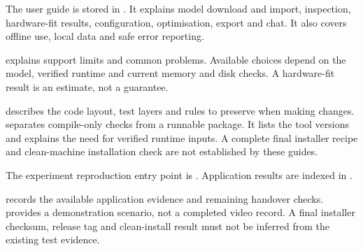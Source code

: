 

The user guide is stored in
. It explains model download
and import, inspection, hardware-fit results, configuration,
optimisation, export and chat. It also covers offline use,
local data and safe error reporting.

 explains support
limits and common problems. Available choices depend on the
model, verified runtime and current memory and disk checks.
A hardware-fit result is an estimate, not a guarantee.


 describes the code
layout, test layers and rules to preserve when making changes.
 separates
compile-only checks from a runnable package. It lists the
tool versions and explains the need for verified runtime
inputs. A complete final installer recipe and clean-machine
installation check are not established by these guides.

The experiment reproduction entry point is
.
Application results are indexed in
.


 records the available
application evidence and remaining handover checks.
 provides a demonstration
scenario, not a completed video record. A final installer
checksum, release tag and clean-install result must not be
inferred from the existing test evidence.
